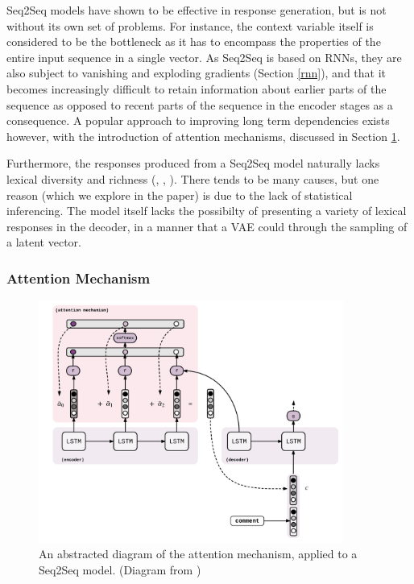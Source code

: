 \documentclass[12pt,twoside]{report}
\begin{document}
Seq2Seq models have shown to be effective in response generation, but is not without its own set of problems. For instance, the context variable itself is considered to be the bottleneck as it has to encompass the properties of the entire input sequence in a single vector. As Seq2Seq is based on RNNs, they are also subject to vanishing and exploding gradients (Section \ref{rnn}), and that it becomes increasingly difficult to retain information about earlier parts of the sequence as opposed to recent parts of the sequence in the encoder stages as a consequence. A popular approach to improving long term dependencies exists however, with the introduction of attention mechanisms, discussed in Section \ref{seq2seq_attn}.

Furthermore, the responses produced from a Seq2Seq model naturally lacks lexical diversity and richness (\cite{serban_hierarchical_2016}, \cite{zhao_learning_2017}, \cite{jiang_why_2018}). There tends to be many causes, but one reason (which we explore in the paper) is due to the lack of statistical inferencing. The model itself lacks the possibilty of presenting a variety of lexical responses in the decoder, in a manner that a VAE could through the sampling of a latent vector.

\subsubsection{Attention Mechanism}

\begin{figure}[!ht]
      
	\centering
	\includegraphics[width=100mm]{diagrams/seq2seq_attention_mechanism.pdf}
	\caption{An abstracted diagram of the attention mechanism, applied to a Seq2Seq model. (Diagram from \cite{genthial_seq2seq_2017})\label{seq2seq_attn}}
\end{figure}
\end{document}
